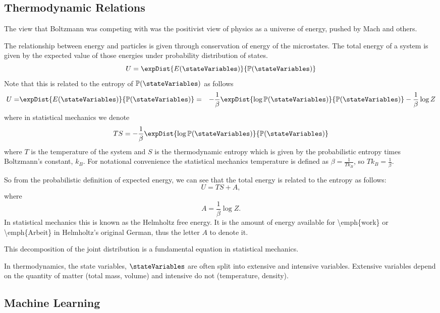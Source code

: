 \subsection{Thermodynamic Relations}\label{thermodynamic-relations}

The view that Boltzmann was competing with was the positivist view of
physics as a universe of energy, pushed by Mach and others.

The relationship between energy and particles is given through
conservation of energy of the microstates. The total energy of a system
is given by the expected value of those energies under probability
distribution of states. \[
U = \expDist{E(\stateVariables)}{\mathbb{P}(\stateVariables)}
\] Note that this is related to the entropy of
\(\mathbb{P}(\stateVariables)\) 
as follows
\begin{align*} 
U = &
\expDist{E(\stateVariables)}{\mathbb{P}(\stateVariables)}
 = &
-\frac{1}{\beta}\expDist{\log
\mathbb{P}(\stateVariables)}{\mathbb{P}(\stateVariables)}
- \frac{1}{\beta} \log Z
\end{align*} 
where in statistical mechanics we denote \[
TS = -\frac{1}{\beta}\expDist{\log\mathbb{P}(\stateVariables)}{\mathbb{P}(\stateVariables)}
\] 
where \(T\) is the temperature of the system and \(S\) is the
thermodynamic entropy which is given by the probabilistic entropy times
Boltzmann's constant, \(k_B\). For notational convenience the
statistical mechanics temperature is defined as
\(\beta = \frac{1}{T k_B}\), so \(Tk_B = \frac{1}{\beta}\).

So from the probabilistic definition of expected energy, we can see that
the total energy is related to the entropy as follows: 
\[
U = TS + A,
\] 
where 
\[
A = \frac{1}{\beta} \log Z.
\] 
In statistical mechanics this is known as the Helmholtz free energy.
It is the amount of energy available for \textbackslash emph\{work\} or
\textbackslash emph\{Arbeit\} in Helmholtz's original German, thus the
letter \(A\) to denote it.

This decomposition of the joint distribution is a fundamental equation
in statistical mechanics.

In thermodynamics, the state variables, \(\stateVariables\) are often
split into extensive and intensive variables. Extensive variables depend
on the quantity of matter (total mass, volume) and intensive do not
(temperature, density).

\subsection{Machine Learning}\label{machine-learning}

